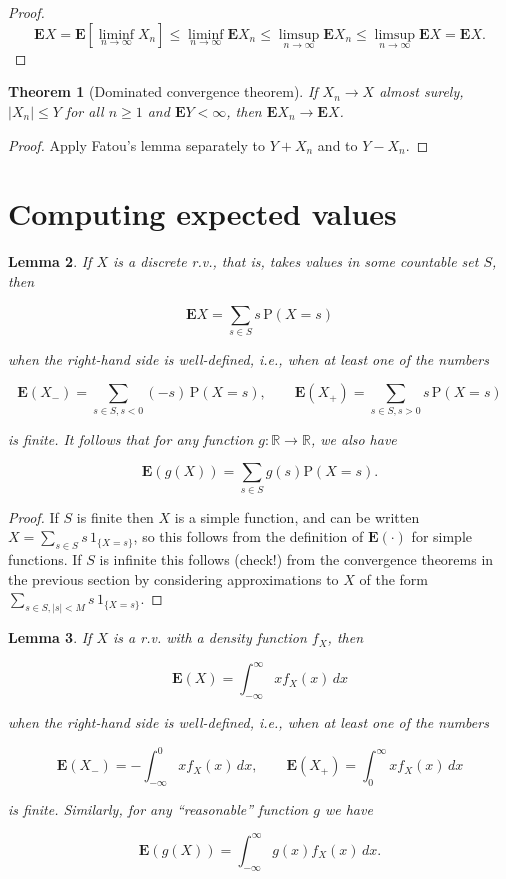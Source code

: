 \documentclass[11pt]{report}
\newcommand{\R}{\mathbb{R}}
\theoremstyle{plain}
\newtheorem{thm}{Theorem}[chapter]
\newtheorem{lem}[thm]{Lemma}
\theoremstyle{definition}
\begin{document}
\begin{proof}

\[
\mathbf{E} X = \mathbf{E} [\liminf_{n\to\infty} X_n] \le \liminf_{n\to\infty} \mathbf{E} X_n \le \limsup_{n\to\infty} \mathbf{E} X_n \le \limsup_{n\to\infty}  \mathbf{E} X = \mathbf{E} X.
\]

\end{proof}

\begin{thm}[Dominated convergence theorem]
If $X_n\to X$ almost surely, $|X_n|\le Y$ for all
$n\ge 1$ and $\mathbf{E} Y<\infty$, then
$\mathbf{E} X_n\to \mathbf{E} X$.
\end{thm}

\begin{proof}
Apply Fatou's lemma separately to $Y+X_n$ and to
$Y-X_n$.
\end{proof}

\section{Computing expected values}

\begin{lem}
If $X$ is a discrete r.v., that is, takes values in
some countable set $S$, then

\[
\mathbf{E} X = \sum_{s\in S} s\, \mathrm{P}(X=s)
\]

\noindent when the right-hand side is well-defined, i.e., when
at least one of the numbers

\[
\mathbf{E}(X_-)=\sum_{s\in S, s<0} (-s)\,\mathrm{P}(X=s), \qquad \mathbf{E}(X_+)= \sum_{s\in S, s>0} s\, \mathrm{P}(X=s)
\]

\noindent is finite. It follows that for any function
$g:\R\to\R$, we also have

\[
\mathbf{E}(g(X)) = \sum_{s\in S} g(s) \mathrm{P}(X=s).
\]

\end{lem}

\begin{proof}
If $S$ is finite then $X$ is a simple function, and
can be written $X=\sum_{s\in S} s\,1_{\{X=s\}}$, so
this follows from the definition of
$\mathbf{E}(\cdot)$ for simple functions. If $S$ is
infinite this follows (check!) from the convergence
theorems in the previous section by considering
approximations to $X$ of the form
$\sum_{s\in S, |s|<M} s\, 1_{\{X=s\}}$.
\end{proof}

\begin{lem}
If $X$ is a r.v. with a density function $f_X$, then

\[
\mathbf{E}(X) = \int_{-\infty}^\infty x f_X(x)\,dx
\]

\noindent when the right-hand side is well-defined, i.e., when
at least one of the numbers

\[
\mathbf{E}(X_-) = -\int_{-\infty}^0 x f_X(x)\,dx, \qquad \mathbf{E}(X_+) = \int_0^\infty x f_X(x)\,dx
\]

\noindent is finite. Similarly, for any ``reasonable'' function
$g$ we have

\[
\mathbf{E}(g(X)) = \int_{-\infty}^\infty g(x) f_X(x)\, dx.
\]

\end{lem}
\end{document}
